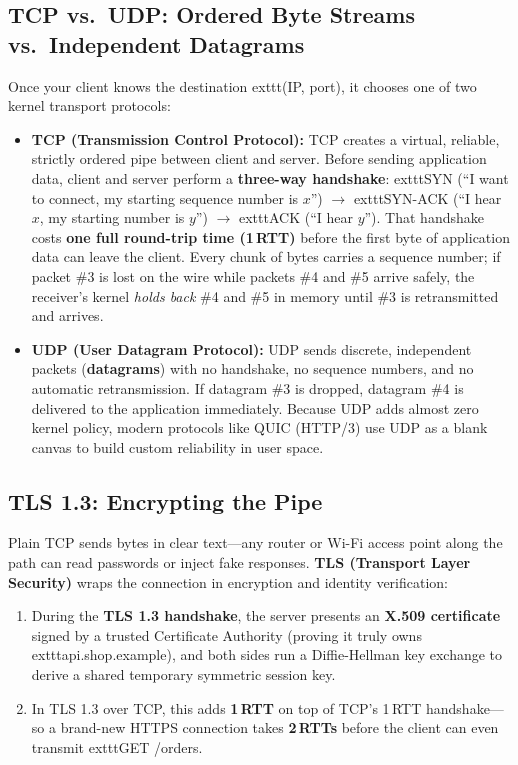 \subsection{TCP vs.\ UDP: Ordered Byte Streams vs.\ Independent Datagrams}

Once your client knows the destination 	exttt{(IP, port)}, it chooses one of two kernel transport protocols:
\begin{itemize}[leftmargin=15pt]
  \item \textbf{TCP (Transmission Control Protocol):} TCP creates a virtual, reliable, strictly ordered pipe between client and server. Before sending application data, client and server perform a \textbf{three-way handshake}: 	exttt{SYN} (``I want to connect, my starting sequence number is $x$'') $\rightarrow$ 	exttt{SYN-ACK} (``I hear $x$, my starting number is $y$'') $\rightarrow$ 	exttt{ACK} (``I hear $y$''). That handshake costs \textbf{one full round-trip time (1\,RTT)} before the first byte of application data can leave the client. Every chunk of bytes carries a sequence number; if packet \#3 is lost on the wire while packets \#4 and \#5 arrive safely, the receiver's kernel \emph{holds back} \#4 and \#5 in memory until \#3 is retransmitted and arrives.
  \item \textbf{UDP (User Datagram Protocol):} UDP sends discrete, independent packets (\textbf{datagrams}) with no handshake, no sequence numbers, and no automatic retransmission. If datagram \#3 is dropped, datagram \#4 is delivered to the application immediately. Because UDP adds almost zero kernel policy, modern protocols like QUIC (HTTP/3) use UDP as a blank canvas to build custom reliability in user space.
\end{itemize}

\subsection{TLS 1.3: Encrypting the Pipe}

Plain TCP sends bytes in clear text---any router or Wi-Fi access point along the path can read passwords or inject fake responses. \textbf{TLS (Transport Layer Security)} wraps the connection in encryption and identity verification:
\begin{enumerate}[leftmargin=15pt]
  \item During the \textbf{TLS 1.3 handshake}, the server presents an \textbf{X.509 certificate} signed by a trusted Certificate Authority (proving it truly owns 	exttt{api.shop.example}), and both sides run a Diffie-Hellman key exchange to derive a shared temporary symmetric session key.
  \item In TLS 1.3 over TCP, this adds \textbf{1\,RTT} on top of TCP's 1\,RTT handshake---so a brand-new HTTPS connection takes \textbf{2\,RTTs} before the client can even transmit 	exttt{GET /orders}.
\end{enumerate}

